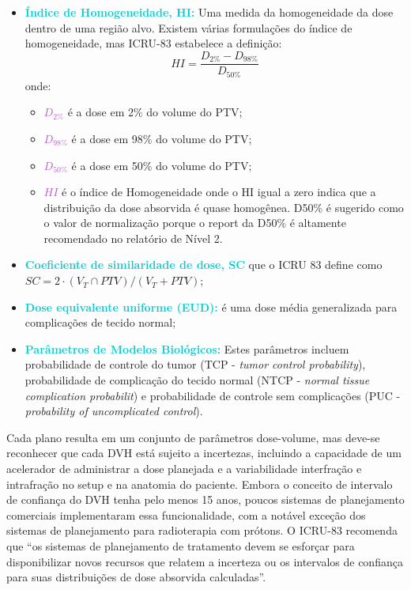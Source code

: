 \documentclass[11pt,a4paper]{article}
\begin{document}
\begin{itemize}[label=\textcolor{CarnationPink}{$\blacktriangleright$}]
		\item \textcolor{DarkTurquoise}{\textbf{Índice de Homogeneidade, HI:}} Uma medida da homogeneidade da dose dentro de uma região alvo. Existem várias formulações do índice de homogeneidade, mas ICRU-83 estabelece a definição: $$HI = \frac{D_{2\%} - D_{98\%}}{D_{50\%}}$$ onde:
			\begin{itemize}[label=\textcolor{CarnationPink}{$\star$}]
				\item \textcolor{MediumOrchid}{$D_{2\%}$} é a dose em 2\% do volume do PTV;
				\item \textcolor{MediumOrchid}{$D_{98\%}$} é a dose em 98\% do volume do PTV;
				\item \textcolor{MediumOrchid}{$D_{50\%}$} é a dose em 50\% do volume do PTV;
				\item \textcolor{MediumOrchid}{$HI$} é o índice de Homogeneidade onde o HI igual a zero indica que a distribuição da dose absorvida é quase homogênea. D50\% é sugerido como o valor de normalização porque o report da D50\% é altamente recomendado no relatório de Nível 2.
			\end{itemize}

		\item \textcolor{DarkTurquoise}{\textbf{Coeficiente de similaridade de dose, SC}} que o ICRU 83 define como $SC = 2 \cdot (V_T \cap PTV) / (V_T + PTV)$;
		
		\item \textcolor{DarkTurquoise}{\textbf{Dose equivalente uniforme (EUD)\cite{niemierko1997reporting}:}} é uma dose média generalizada para complicações de tecido normal;
		
		\item  \textcolor{DarkTurquoise}{\textbf{Parâmetros de Modelos Biológicos:}} Estes parâmetros incluem probabilidade de controle do tumor (TCP - \textit{tumor control probability}), probabilidade de complicação do tecido normal (NTCP - \textit{normal tissue complication probabilit}) e probabilidade de controle sem complicações (PUC - \textit{probability of uncomplicated control}).
	\end{itemize}

	Cada plano resulta em um conjunto de parâmetros dose-volume, mas deve-se reconhecer que cada DVH está sujeito a incertezas, incluindo a capacidade de um acelerador de administrar a dose planejada e a variabilidade  interfração e intrafração no setup e na anatomia do paciente. Embora o conceito de intervalo de confiança do DVH tenha pelo menos 15 anos, poucos sistemas de planejamento comerciais implementaram essa funcionalidade, com a notável exceção dos sistemas de planejamento para radioterapia com prótons. O ICRU-83 recomenda que ``os sistemas de planejamento de tratamento devem se esforçar para disponibilizar novos recursos que relatem a incerteza ou os intervalos de confiança para suas distribuições de dose absorvida calculadas''.
\end{document}
